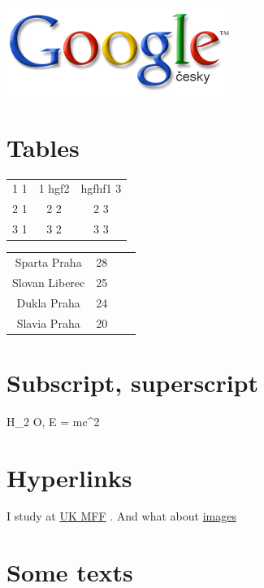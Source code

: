 \documentclass{article}
\begin{document}
\par
\includegraphics{logo.png}


\section{Tables}
\begin{table}[h!]
\centering
\begin{tabular}{|c|c|c|}
1 1 & 1 hgf2 & hgfhf1 3 \\
2 1 & 2 2 & 2 3 \\
3 1 & 3 2 & 3 3 \\

\end{tabular}
\end{table}
\newline\begin{table}[h!]
\centering
\begin{tabular}{|c|c|c|c|}
Sparta Praha & 28 \\
Slovan Liberec & 25 \\
Dukla Praha & 24 \\
Slavia Praha & 20 \\

\end{tabular}
\end{table}
\section{Subscript, superscript}

\par
H_{2}
O, E = mc^{2}

\section{Hyperlinks}

\par
I study at 
\href{http://www.mff.cuni.cz}{UK MFF}
. And
    what about 
\href{}{images}

\section{Some texts}
\end{document}
